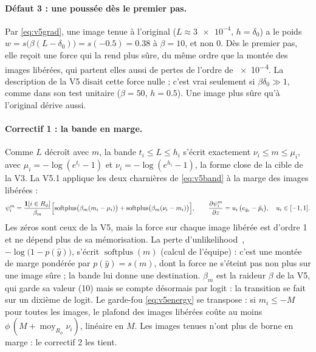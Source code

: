 \documentclass[11pt,a4paper]{article}
\newcommand{\Exp}{\operatorname*{moy}}
\begin{document}
\paragraph{Défaut 3 : une poussée dès le premier pas.} Par \eqref{eq:v5grad}, une image tenue à
l'original ($L\approx\num{3e-4}$, $h=\delta_0$) a le poids $w=s\bigl(\beta(L-\delta_0)\bigr)=s(\num{-0.5})
=\num{0.38}$ à $\beta=10$, et non 0. Dès le premier pas, elle reçoit une force qui la rend plus sûre,
du même ordre que la montée des images libérées, qui partent elles aussi de pertes de l'ordre de
\num{e-4}. La description de la V5 disait cette force nulle ; c'est vrai seulement si
$\beta\delta_0\gg1$, comme dans son test unitaire ($\beta=50$, $h=\num{0.5}$). Une image plus sûre
qu'à l'original dérive aussi.

\paragraph{Correctif 1 : la bande en marge.} Comme $L$ décroît avec $m$, la bande $t_i\le L\le h_i$
s'écrit exactement $\nu_i\le m\le\mu_i$, avec $\mu_i=-\log(e^{t_i}-1)$ et $\nu_i=-\log(e^{h_i}-1)$, la
forme close de la cible de la V3. La V5.1 applique les deux charnières de \eqref{eq:v5band} à la
marge des images libérées :
\begin{equation}\label{eq:v51band}
  \psi^{m}_i=\frac{\mathbf 1[i\in R_\phi]}{\beta_m}\Bigl[\operatorname{softplus}\bigl(\beta_m(m_i-\mu_i)\bigr)
  +\operatorname{softplus}\bigl(\beta_m(\nu_i-m_i)\bigr)\Bigr],\qquad
  \frac{\partial\psi^{m}_i}{\partial z}=u_i\,\bigl(e_{\hat y_i}-\tilde p_i\bigr),\quad u_i\in[-1,1].
\end{equation}
Les zéros sont ceux de la V5, mais la force sur chaque image libérée est d'ordre 1 et ne dépend plus
de sa mémorisation. La perte d'unlikelihood~\cite{welleck2020unlikelihood},
$-\log\bigl(1-p(\hat y)\bigr)$, s'écrit $\operatorname{softplus}(m)$ (calcul de l'équipe) : c'est une
montée de marge pondérée par $p(\hat y)=s(m)$, dont la force ne s'éteint pas non plus sur une image
sûre ; la bande lui donne une destination. $\beta_m$ est la raideur $\beta$ de la V5, qui garde sa
valeur (10) mais se compte désormais par logit : la transition se fait sur un dixième de logit. Le garde-fou
\eqref{eq:v5energy} se transpose : si $m_i\le-M$ pour toutes les images, le plafond des images
libérées coûte au moins $\phi\,(M+\Exp_{R_\phi}\nu_i)$, linéaire en $M$. Les images tenues n'ont plus
de borne en marge : le correctif 2 les tient.
\end{document}
